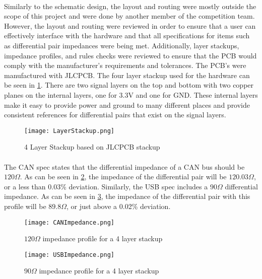 \paragraph{}
Similarly to the schematic design, the layout and routing were mostly outside the scope of this project and were done by another member of the competition team.
However, the layout and routing were reviewed in order to ensure that a user can effectively interface with the hardware and that all specifications for items such as differential pair impedances were being met.
Additionally, layer stackups, impedance profiles, and rules checks were reviewed to ensure that the PCB would comply with the manufacturer's requirements and tolerances.
The PCB's were manufactured with JLCPCB.
The four layer stackup used for the hardware can be seen in \cref{fig:Stackup}.
There are two signal layers on the top and bottom with two copper planes on the internal layers, one for 3.3V and one for GND.
These internal layers make it easy to provide power and ground to many different places and provide consistent references for differential pairs that exist on the signal layers.

\begin{figure}[H]
	\centering
	\texttt{[image: LayerStackup.png]}
	\caption{4 Layer Stackup based on JLCPCB stackup}
	\label{fig:Stackup}
\end{figure}

\paragraph{}
The CAN spec states that the differential impedance of a CAN bus should be $120 \Omega$.
As can be seen in \cref{fig:CANImpedance}, the impedance of the differential pair will be $120.03 \Omega$, or a less than 0.03\% deviation.
Similarly, the USB spec includes a $90 \Omega$ differential impedance.
As can be seen in \cref{fig:USBImpedance}, the impedance of the differential pair with this profile will be $89.8 \Omega$, or just above a 0.02\% deviation.

\begin{figure}[H]
	\centering
	\texttt{[image: CANImpedance.png]}
	\caption{$120 \Omega$ impedance profile for a 4 layer stackup}
	\label{fig:CANImpedance}
\end{figure}

\begin{figure}[H]
	\centering
	\texttt{[image: USBImpedance.png]}
	\caption{$90 \Omega$ impedance profile for a 4 layer stackup}
	\label{fig:USBImpedance}
\end{figure}

